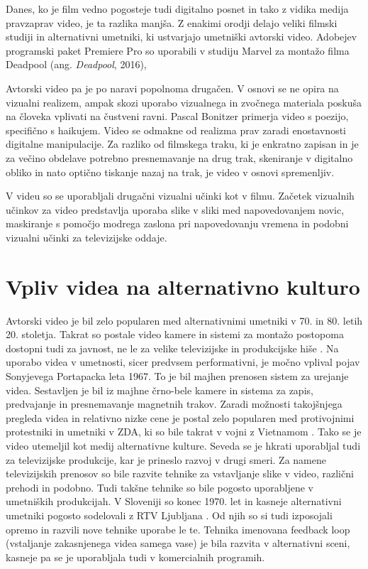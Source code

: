 \documentclass[a4paper, 12pt]{book}
\begin{document}
Danes, ko je film vedno pogosteje tudi digitalno posnet in tako z vidika medija pravzaprav video, je ta razlika manjša.
Z enakimi orodji delajo veliki filmski studiji in alternativni umetniki, ki ustvarjajo umetniški avtorski video.
Adobejev programski paket Premiere Pro so uporabili v studiju Marvel za montažo filma Deadpool (ang. {\it Deadpool}, 2016), %


Avtorski video pa je po naravi popolnoma drugačen.
V osnovi se ne opira na vizualni realizem, ampak skozi uporabo vizualnega in zvočnega materiala poskuša na človeka vplivati na čustveni ravni\cite{slepoPolje}.
Pascal Bonitzer primerja video s poezijo, specifično s haikujem.
Video se odmakne od realizma prav zaradi enostavnosti digitalne manipulacije.
Za razliko od filmskega traku, ki je enkratno zapisan in je za večino obdelave potrebno presnemavanje na drug trak, skeniranje v digitalno obliko in nato optično tiskanje nazaj na trak,
je video v osnovi spremenljiv.

V videu so se uporabljali drugačni vizualni učinki kot v filmu.
Začetek vizualnih učinkov za video predstavlja uporaba slike v sliki med napovedovanjem novic, maskiranje s pomočjo modrega zaslona pri napovedovanju vremena in podobni vizualni učinki za televizijske oddaje.



\section{Vpliv videa na alternativno kulturo}

Avtorski video je bil zelo popularen med alternativnimi umetniki v 70. in 80. letih 20. stoletja.
Takrat so postale video kamere in sistemi za montažo postopoma dostopni tudi za javnost, ne le za velike televizijske in produkcijske hiše \cite{rekonFikc}.
Na uporabo videa v umetnosti, sicer predvsem performativni, je močno vplival pojav Sonyjevega Portapacka leta 1967.
To je bil majhen prenosen sistem za urejanje videa. 
Sestavljen je bil iz majhne črno-bele kamere in sistema za zapis, predvajanje in presnemavanje magnetnih trakov.
Zaradi možnosti takojšnjega pregleda videa in relativno nizke cene je postal zelo popularen med protivojnimi protestniki in umetniki v ZDA, ki so bile takrat v vojni z Vietnamom \cite{videosfera1}.
Tako se je video utemeljil kot medij alternativne kulture.
Seveda se je hkrati uporabljal tudi za televizijske produkcije, kar je prineslo razvoj v drugi smeri.
Za namene televizijskih prenosov so bile razvite tehnike za vstavljanje slike v video, različni prehodi in podobno.
Tudi takšne tehnike so bile pogosto uporabljene v umetniških produkcijah.
V Sloveniji so konec 1970. let in kasneje alternativni umetniki pogosto sodelovali z RTV Ljubljana \cite{tugoslavija}.
Od njih so si tudi izposojali opremo in razvili nove tehnike uporabe le te.
Tehnika imenovana feedback loop (vstaljanje zakasnjenega  videa samega vase) je bila razvita v alternativni sceni, kasneje pa se je uporabljala tudi v komercialnih programih.
\end{document}
